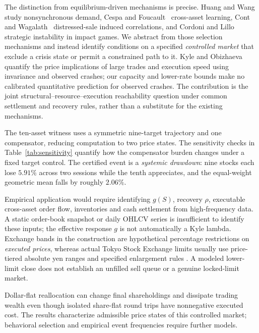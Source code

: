\documentclass[review,hidelinks,onefignum,onetabnum]{siamonline250211}
\begin{document}
The distinction from equilibrium-driven mechanisms is precise. Huang and Wang~\citep{HuangWang2009} study nonsynchronous demand, Cespa and Foucault~\citep{CespaFoucault2014} cross-asset learning, Cont and Wagalath~\citep{ContWagalath2013} distressed-sale induced correlations, and Cordoni and Lillo~\citep{CordoniLillo2024} strategic instability in impact games. We abstract from those selection mechanisms and instead identify conditions on a specified \emph{controlled market} that exclude a crisis state or permit a constrained path to it. Kyle and Obizhaeva~\citep{KyleObizhaeva2023} quantify the price implications of large trades and execution speed using invariance and observed crashes; our capacity and lower-rate bounds make no calibrated quantitative prediction for observed crashes. The contribution is the joint structural--resource--execution reachability question under common settlement and recovery rules, rather than a substitute for the existing mechanisms.

The ten-asset witness uses a symmetric nine-target trajectory and one compensator, reducing computation to two price states. The sensitivity checks in Table~\ref{tab:sensitivity} quantify how the compensator burden changes under a fixed target control. The certified event is a \emph{systemic drawdown}: nine stocks each lose $5.91\%$ across two sessions while the tenth appreciates, and the equal-weight geometric mean falls by roughly $2.06\%$.

Empirical application would require identifying $g(S)$, recovery $\rho$, executable cross-asset order flow, inventories and cash settlement from high-frequency data. A static order-book snapshot or daily OHLCV series is insufficient to identify these inputs; the effective response $g$ is not automatically a Kyle lambda. Exchange bands in the construction are hypothetical percentage restrictions on \emph{executed prices}, whereas actual Tokyo Stock Exchange limits usually use price-tiered absolute yen ranges and specified enlargement rules \citep{JPX2026}. A modeled lower-limit close does not establish an unfilled sell queue or a genuine locked-limit market.

Dollar-flat reallocation can change final shareholdings and dissipate trading wealth even though isolated share-flat round trips have nonnegative executed cost. The results characterize admissible price states of this controlled market; behavioral selection and empirical event frequencies require further models.
\end{document}
